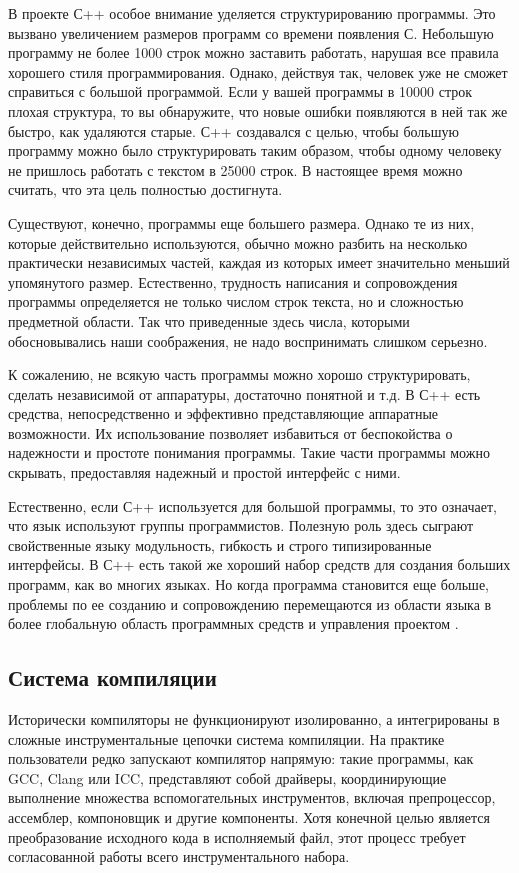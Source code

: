 В проекте С++ особое внимание уделяется структурированию программы. Это вызвано увеличением размеров программ со времени появления С. Небольшую программу не более 1000 строк можно заставить работать, нарушая все правила хорошего стиля программирования. Однако, действуя так, человек уже не сможет справиться с большой программой. Если у вашей программы в 10000 строк плохая структура, то вы обнаружите, что новые ошибки появляются в ней так же быстро, как удаляются старые. С++ создавался с целью, чтобы большую программу можно было структурировать таким образом, чтобы одному человеку не пришлось работать с текстом в 25000 строк. В настоящее время можно считать, что эта цель полностью достигнута.

Существуют, конечно, программы еще большего размера. Однако те из них, которые действительно используются, обычно можно разбить на несколько практически независимых частей, каждая из которых имеет значительно меньший упомянутого размер. Естественно, трудность написания и сопровождения программы определяется не только числом строк текста, но и сложностью предметной области. Так что приведенные здесь числа, которыми обосновывались наши соображения, не надо воспринимать слишком серьезно.

К сожалению, не всякую часть программы можно хорошо структурировать, сделать независимой от аппаратуры, достаточно понятной и т.д. В С++ есть средства, непосредственно и эффективно представляющие аппаратные возможности. Их использование позволяет избавиться от беспокойства о надежности и простоте понимания программы. Такие части программы можно скрывать, предоставляя надежный и простой интерфейс с ними.

Естественно, если С++ используется для большой программы, то это означает, что язык используют группы программистов. Полезную роль здесь сыграют свойственные языку модульность, гибкость и строго типизированные интерфейсы. В С++ есть такой же хороший набор средств для создания больших программ, как во многих языках. Но когда программа становится еще больше, проблемы по ее созданию и сопровождению перемещаются из области языка в более глобальную область программных средств и управления проектом \cite{StroustrupCpp}.


\subsection{Система компиляции}

Исторически компиляторы не функционируют изолированно, а интегрированы в сложные инструментальные цепочки система компиляции. На практике пользователи редко запускают компилятор напрямую: такие программы, как GCC, Clang или ICC, представляют собой драйверы, координирующие выполнение множества вспомогательных инструментов, включая препроцессор, ассемблер, компоновщик и другие компоненты. Хотя конечной целью является преобразование исходного кода в исполняемый файл, этот процесс требует согласованной работы всего инструментального набора.

